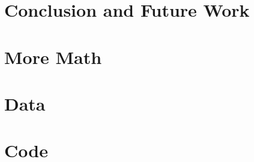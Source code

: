 \documentclass[12pt,twosided]{report}
\begin{document}
\chapter{Conclusion and Future Work}
\label{chap:outro}


\begin{appendices}

  
\chapter{More Math}


\chapter{Data}


\chapter{Code}

\end{appendices}

\printbibliography[heading=bibintoc,title={References}]
\end{document}
